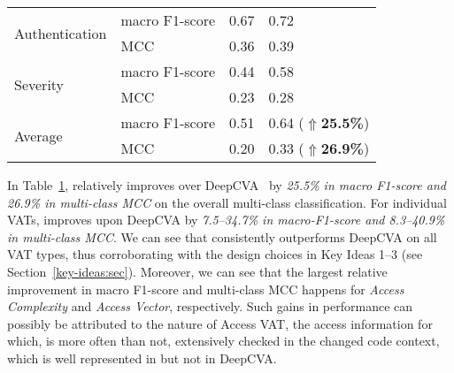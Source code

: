 \begin{table}[t]
\begin{center}
\begin{tabular}{l|p{1.9cm}<{\centering}|p{1.5cm}<{\centering}|p{1.5cm}<{\centering}}
			\hline
			\multirow{2}{*}{Authentication}  & macro F1-score                             &   0.67         & 0.72\\
			\cline{2-4}
			                                 & MCC                                 &   0.36         & 0.39\\
			\hline
			\multirow{2}{*}{Severity}        & macro F1-score                             &   0.44         & 0.58\\
			\cline{2-4}
			                                 & MCC                                 &   0.23         & 0.28\\
			\hline
			\hline
			\multirow{2}{*}{Average}         & macro F1-score                             &    0.51        & 0.64 ($\Uparrow${\bf 25.5\%})\\
			\cline{2-4}
			                                 & MCC                                 & 0.20           & 0.33 ($\Uparrow${\bf 26.9\%})\\
            \hline
		\end{tabular}
		\label{rq1_results}
	\end{center}
\end{table}

In Table~\ref{rq1_results}, {\tool} relatively improves over DeepCVA~\cite{deepCVA-ase21} by {\em 25.5\% in macro F1-score and
26.9\% in multi-class MCC} on the overall multi-class classification. For individual VATs, {\tool} improves upon DeepCVA by {\em 7.5--34.7\% in macro-F1-score and 8.3--40.9\% in multi-class MCC}. We can see that {\tool} consistently outperforms DeepCVA on all VAT types, thus corroborating with the design choices in Key Ideas 1--3 (see Section~\ref{key-ideas:sec}). Moreover, we can see that the largest relative improvement in macro F1-score and multi-class MCC happens for {\em Access Complexity} and {\em Access Vector}, respectively. Such gains in performance can possibly be attributed to the nature of Access VAT, the access information for which, is more often than not, extensively checked in the changed code context, which is well represented in {\tool} but not in DeepCVA.




